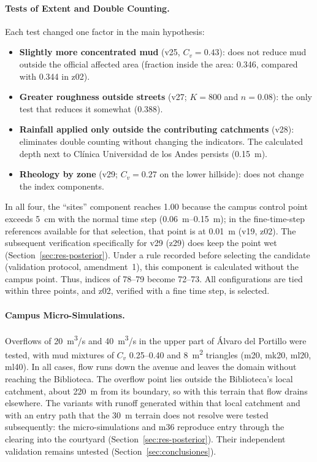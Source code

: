 \paragraph{Tests of Extent and Double Counting.} Each test changed one factor in the main hypothesis:
\begin{itemize}
\item \textbf{Slightly more concentrated mud} (v25, $C_v=0.43$): does not reduce mud outside the official affected area (fraction inside the area: 0.346, compared with 0.344 in z02).
\item \textbf{Greater roughness outside streets} (v27; $K=800$ and $n=0.08$): the only test that reduces it somewhat (0.388).
\item \textbf{Rainfall applied only outside the contributing catchments} (v28): eliminates double counting without changing the indicators. The calculated depth next to Clínica Universidad de los Andes persists (\SI{0.15}{m}).
\item \textbf{Rheology by zone} (v29; $C_v=0.27$ on the lower hillside): does not change the index components.
\end{itemize}
In all four, the ``sites'' component reaches 1.00 because the campus control point exceeds \SI{5}{cm} with the normal time step (\SIrange{0.06}{0.15}{m}); in the fine-time-step references available for that selection, that point is at \SI{0.01}{m} (v19, z02). The subsequent verification specifically for v29 (z29) does keep the point wet (Section~\ref{sec:res-posterior}). Under a rule recorded before selecting the candidate (validation protocol, amendment~1), this component is calculated without the campus point. Thus, indices of 78--79 become 72--73. All configurations are tied within three points, and z02, verified with a fine time step, is selected.

\paragraph{Campus Micro-Simulations.} Overflows of \SI{20}{m^3/s} and \SI{40}{m^3/s} in the upper part of Álvaro del Portillo were tested, with mud mixtures of $C_v$ 0.25--0.40 and \SI{8}{m^2} triangles (m20, mk20, ml20, ml40). In all cases, flow runs down the avenue and leaves the domain without reaching the Biblioteca. The overflow point lies outside the Biblioteca's local catchment, about \SI{220}{m} from its boundary, so with this terrain that flow drains elsewhere. The variants with runoff generated within that local catchment and with an entry path that the \SI{30}{m} terrain does not resolve were tested subsequently: the micro-simulations and m36 reproduce entry through the clearing into the courtyard (Section~\ref{sec:res-posterior}). Their independent validation remains untested (Section~\ref{sec:conclusiones}).

